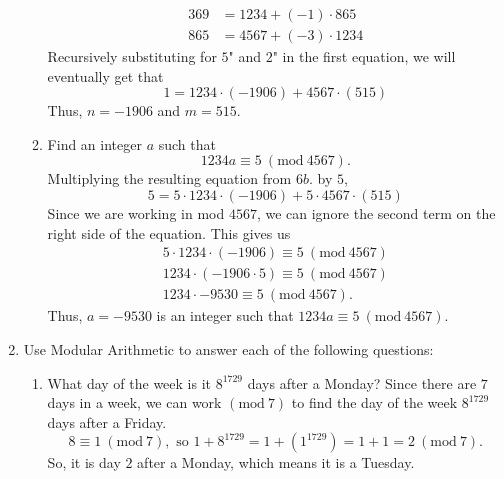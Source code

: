 \documentclass{article}
\begin{document}
\begin{enumerate}
\begin{enumerate}
\begin{align*}
                            369 &= 1234 + (\minus1)\cdot 865  \\
                            865 &= 4567 + (\minus3)\cdot 1234 
                        \end{align*}
                        Recursively substituting for \lQuote$5$" and \lQuote$2$" in the first equation, we will eventually get that 
                            \[
                                1 = 1234\cdot (\minus 1906) + 4567 \cdot (515)
                            \]
                        Thus, $n = \minus 1906$ and $m = 515$.
    			\item Find an integer $a$ such that
    				\[
    					1234a \equiv 5 \ (\mathrm{mod}\ 4567).
    				\]
                        Multiplying the resulting equation from $6b.$ by $5$,
                            \[
                                5 = 5 \cdot 1234\cdot (\minus 1906) + 5 \cdot 4567 \cdot (515)
                            \]
                        Since we are working in mod $4567$, we can ignore the second term on the right side of the equation. This gives us 
                            \begin{align*}
                                5 \cdot 1234 \cdot (\minus 1906) \equiv 5\ (\mathrm{mod}\ 4567) \\
                                1234 \cdot (\minus 1906 \cdot 5) \equiv 5\ (\mathrm{mod}\ 4567) \\
                                1234 \cdot \minus 9530 \equiv 5\ (\mathrm{mod}\ 4567).
                            \end{align*}
                        Thus, $a = \minus9530$ is an integer such that $1234a \equiv 5 \ (\mathrm{mod}\ 4567).$
    		\end{enumerate}

    	\item Use Modular Arithmetic to answer each of the following questions:
    		\begin{enumerate}
    			\item What day of the week is it $8^{1729}$ days after a Monday? \ppar
                        Since there are $7$ days in a week, we can work $(\mathrm{mod}\ 7)$ to find the day of the week $8^{1729}$ days after a Friday.
                            \[
                                8 \equiv 1\ (\mathrm{mod}\ 7), \text{ so }1 + 8^{1729} = 1 + (1^{1729}) = 1 + 1 = 2\ (\mathrm{mod}\ 7).
                            \]
                        So, it is day $2$ after a Monday, which means it is a Tuesday.
                        

\end{enumerate}
\end{enumerate}
\end{document}

